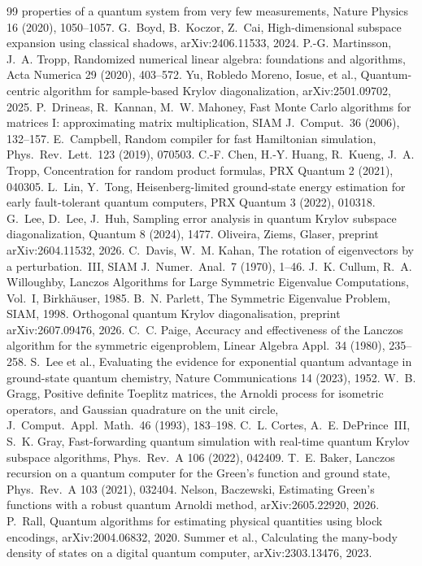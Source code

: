 \documentclass[11pt,a4paper]{article}
\begin{document}
\begin{thebibliography}{99}
  properties of a quantum system from very few measurements, Nature
  Physics 16 (2020), 1050--1057.
 G.~Boyd, B.~Koczor, Z.~Cai, High-dimensional subspace
  expansion using classical shadows, arXiv:2406.11533, 2024.
 P.-G. Martinsson, J.~A. Tropp, Randomized numerical linear
  algebra: foundations and algorithms, Acta Numerica 29 (2020), 403--572.
 Yu, Robledo Moreno, Iosue, et al., Quantum-centric algorithm
  for sample-based Krylov diagonalization, arXiv:2501.09702, 2025.
 P.~Drineas, R.~Kannan, M.~W. Mahoney, Fast Monte Carlo
  algorithms for matrices I: approximating matrix multiplication, SIAM J.\
  Comput.\ 36 (2006), 132--157.
 E.~Campbell, Random compiler for fast Hamiltonian
  simulation, Phys.\ Rev.\ Lett.\ 123 (2019), 070503.
 C.-F. Chen, H.-Y. Huang, R.~Kueng, J.~A. Tropp,
  Concentration for random product formulas, PRX Quantum 2 (2021), 040305.
\bibitem{LT22} L.~Lin, Y.~Tong, Heisenberg-limited ground-state energy
  estimation for early fault-tolerant quantum computers, PRX Quantum 3
  (2022), 010318.
 G.~Lee, D.~Lee, J.~Huh, Sampling error analysis in quantum
  Krylov subspace diagonalization, Quantum 8 (2024), 1477.
 Oliveira, Ziems, Glaser, preprint arXiv:2604.11532, 2026.
\bibitem{DK70} C.~Davis, W.~M. Kahan, The rotation of eigenvectors by a
  perturbation.~III, SIAM J.\ Numer.\ Anal.\ 7 (1970), 1--46.
 J.~K. Cullum, R.~A. Willoughby, Lanczos Algorithms for Large
  Symmetric Eigenvalue Computations, Vol.~I, Birkh\"auser, 1985.
\bibitem{Parlett98} B.~N. Parlett, The Symmetric Eigenvalue Problem, SIAM,
  1998.
 Orthogonal quantum Krylov diagonalisation, preprint
  arXiv:2607.09476, 2026.
 C.~C. Paige, Accuracy and effectiveness of the Lanczos
  algorithm for the symmetric eigenproblem, Linear Algebra Appl.\ 34
  (1980), 235--258.
 S.~Lee et al., Evaluating the evidence for exponential
  quantum advantage in ground-state quantum chemistry, Nature
  Communications 14 (2023), 1952.
 W.~B. Gragg, Positive definite Toeplitz matrices, the
  Arnoldi process for isometric operators, and Gaussian quadrature on the
  unit circle, J.\ Comput.\ Appl.\ Math.\ 46 (1993), 183--198.
 C.~L. Cortes, A.~E. DePrince~III, S.~K. Gray, Fast-forwarding
  quantum simulation with real-time quantum Krylov subspace algorithms,
  Phys.\ Rev.\ A 106 (2022), 042409.
 T.~E. Baker, Lanczos recursion on a quantum computer for
  the Green's function and ground state, Phys.\ Rev.\ A 103 (2021), 032404.
\bibitem{NB26} Nelson, Baczewski, Estimating Green's functions with a
  robust quantum Arnoldi method, arXiv:2605.22920, 2026.
 P.~Rall, Quantum algorithms for estimating physical
  quantities using block encodings, arXiv:2004.06832, 2020.
 Summer et al., Calculating the many-body density of
  states on a digital quantum computer, arXiv:2303.13476, 2023.
\end{thebibliography}
\end{document}
